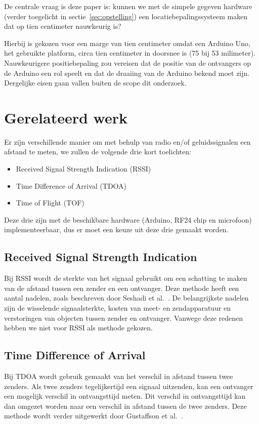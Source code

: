 \documentclass[a4paper,10pt]{article}
\begin{document}
De centrale vraag is deze paper is: kunnen we met de simpele gegeven hardware (verder toegelicht in sectie~\ref{sec:opstelling}) een locatiebepalingssysteem maken dat op tien centimeter nauwkeurig is?

Hierbij is gekozen voor een marge van tien centimeter omdat een Arduino Uno, het gebruikte platform, circa tien centimeter in doorsnee is (75 bij 53 milimeter). Nauwkeurigere positiebepaling zou vereisen dat de positie van de ontvangers op de Arduino een rol speelt en dat de draaiing van de Arduino bekend moet zijn. Dergelijke eisen gaan vallen buiten de scope dit onderzoek.

\section{Gerelateerd werk}\label{sec:gerelateerd}
Er zijn verschillende manier om met behulp van radio en/of geluidssignalen een afstand te meten, we zullen de volgende drie kort toelichten:
\begin{itemize}
    \item Received Signal Strength Indication (RSSI)
    \item Time Difference of Arrival (TDOA)
    \item Time of Flight (TOF)
\end{itemize}
Deze drie zijn met de beschikbare hardware (Arduino, RF24 chip en microfoon) implementeerbaar, dus er moet een keuze uit deze drie gemaakt worden.

\subsection{Received Signal Strength Indication}
Bij RSSI wordt de sterkte van het signaal gebruikt om een schatting te maken van de afstand tussen een zender en een ontvanger. Deze methode heeft een aantal nadelen, zoals beschreven door Seshadi et al.~\cite{seshadri2005bayesian}. De belangrijkste nadelen zijn de wisselende signaalsterkte, kosten van meet- en zendapparatuur en verstoringen van objecten tussen zender en ontvanger. Vanwege deze redenen hebben we niet voor RSSI als methode gekozen.

\subsection{Time Difference of Arrival}
Bij TDOA wordt gebruik gemaakt van het verschil in afstand tussen twee zenders. Als twee zenders tegelijkertijd een signaal uitzenden, kan een ontvanger een mogelijk verschil in ontvangsttijd meten. Dit verschil in ontvangsttijd kan dan omgezet worden naar een verschil in afstand tussen de twee zenders. Deze methode wordt verder uitgewerkt door Gustaffson et al.~\cite{gustafsson2003positioning}.
\end{document}
